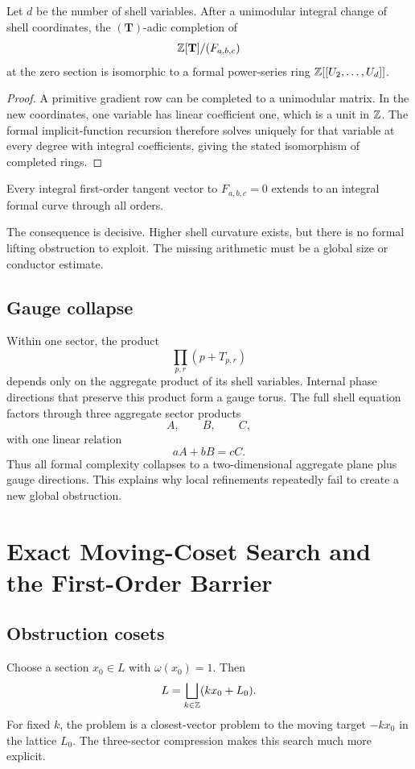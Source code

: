 \begin{theorem}
Let $d$ be the number of shell variables. After a unimodular integral change of shell coordinates, the $(\mathbf T)$-adic completion of
\[
 \mathbb Z[\mathbf T]/(F_{a,b,c})
\]
at the zero section is isomorphic to a formal power-series ring $\mathbb Z[[U_2,\ldots,U_d]]$.
\end{theorem}

\begin{proof}
A primitive gradient row can be completed to a unimodular matrix. In the new coordinates, one variable has linear coefficient one, which is a unit in $\mathbb Z$. The formal implicit-function recursion therefore solves uniquely for that variable at every degree with integral coefficients, giving the stated isomorphism of completed rings.
\end{proof}

\begin{corollary}
Every integral first-order tangent vector to $F_{a,b,c}=0$ extends to an integral formal curve through all orders.
\end{corollary}

The consequence is decisive. Higher shell curvature exists, but there is no formal lifting obstruction to exploit. The missing arithmetic must be a global size or conductor estimate.

\section{Gauge collapse}
Within one sector, the product
\[
 \prod_{p,r}(p+T_{p,r})
\]
depends only on the aggregate product of its shell variables. Internal phase directions that preserve this product form a gauge torus. The full shell equation factors through three aggregate sector products
\[
 A,
 \qquad
 B,
 \qquad
 C,
\]
with one linear relation
\[
 aA+bB=cC.
\]
Thus all formal complexity collapses to a two-dimensional aggregate plane plus gauge directions. This explains why local refinements repeatedly fail to create a new global obstruction.

\chapter{Exact Moving-Coset Search and the First-Order Barrier}

\section{Obstruction cosets}
Choose a section $x_0\in L$ with $\omega(x_0)=1$. Then
\[
 L
 =
 \bigsqcup_{k\in\mathbb Z}
 (kx_0+L_0).
\]
For fixed $k$, the problem is a closest-vector problem to the moving target $-kx_0$ in the lattice $L_0$. The three-sector compression makes this search much more explicit.

